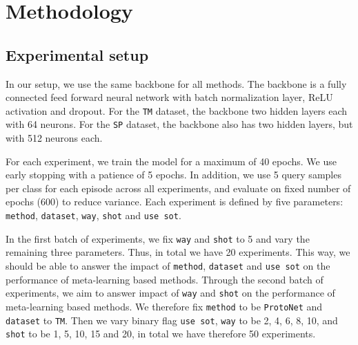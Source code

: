 \section{Methodology}

\subsection{Experimental setup}
In our setup, we use the same backbone for all methods. The backbone is a fully connected feed forward neural network with batch normalization
layer, ReLU activation and dropout. For the \texttt{TM} dataset, the backbone two hidden layers each with 64 neurons. For the \texttt{SP} dataset,
the backbone also has two hidden layers, but with 512 neurons each. 

For each experiment, we train the model for a maximum of 40 epochs. We use early stopping with a patience of 5 epochs. In addition, we use 5 query samples per class for each episode across all experiments, and evaluate on fixed number of epochs (600) to reduce variance.  Each experiment is defined by five parameters: \texttt{method}, \texttt{dataset}, \texttt{way}, \texttt{shot} and \texttt{use sot}.

In the first batch of experiments, we fix \texttt{way} and \texttt{shot} to 5 and vary the remaining three parameters. Thus, in total we have 20 experiments. 
This way, we should be able to answer the impact of \texttt{method}, \texttt{dataset} and \texttt{use sot} on the performance of meta-learning based methods.
Through the second batch of experiments, we aim to answer impact of \texttt{way} and \texttt{shot} on the performance of meta-learning based methods.
We therefore fix \texttt{method} to be \texttt{ProtoNet} and \texttt{dataset} to \texttt{TM}. Then we vary binary flag \texttt{use sot}, \texttt{way} to be 2, 4, 6, 8, 10, and \texttt{shot} to be 1, 5, 10, 15 and 20, in total we have therefore 50 experiments.

